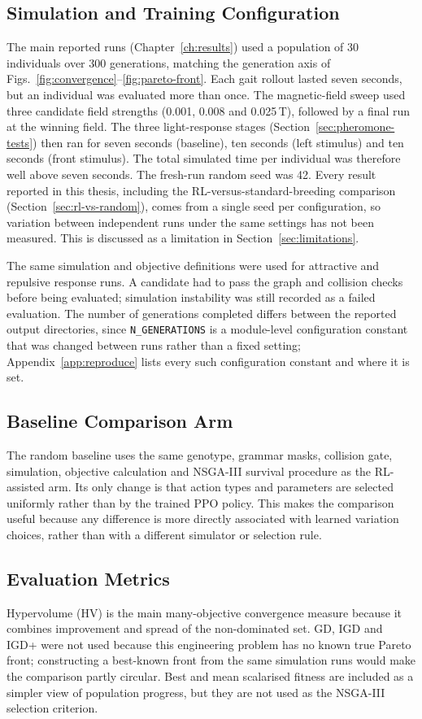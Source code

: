 \documentclass[12pt,a4paper]{report}
\begin{document}
\subsection{Simulation and Training Configuration}
The main reported runs (Chapter~\ref{ch:results}) used a population of 30 individuals over 300 generations, matching the generation axis of Figs.~\ref{fig:convergence}--\ref{fig:pareto-front}. Each gait rollout lasted seven seconds, but an individual was evaluated more than once. The magnetic-field sweep used three candidate field strengths (0.001, 0.008 and 0.025\,T), followed by a final run at the winning field. The three light-response stages (Section~\ref{sec:pheromone-tests}) then ran for seven seconds (baseline), ten seconds (left stimulus) and ten seconds (front stimulus). The total simulated time per individual was therefore well above seven seconds. The fresh-run random seed was 42. Every result reported in this thesis, including the RL-versus-standard-breeding comparison (Section~\ref{sec:rl-vs-random}), comes from a single seed per configuration, so variation between independent runs under the same settings has not been measured. This is discussed as a limitation in Section~\ref{sec:limitations}.

The same simulation and objective definitions were used for attractive and repulsive response runs. A candidate had to pass the graph and collision checks before being evaluated; simulation instability was still recorded as a failed evaluation. The number of generations completed differs between the reported output directories, since \texttt{N\_GENERATIONS} is a module-level configuration constant that was changed between runs rather than a fixed setting; Appendix~\ref{app:reproduce} lists every such configuration constant and where it is set.

\subsection{Baseline Comparison Arm}
The random baseline uses the same genotype, grammar masks, collision gate, simulation, objective calculation and NSGA-III survival procedure as the RL-assisted arm. Its only change is that action types and parameters are selected uniformly rather than by the trained PPO policy. This makes the comparison useful because any difference is more directly associated with learned variation choices, rather than with a different simulator or selection rule.

\subsection{Evaluation Metrics}
\label{sec:eval-metrics}
Hypervolume (HV) is the main many-objective convergence measure because it combines improvement and spread of the non-dominated set. GD, IGD and IGD+ were not used because this engineering problem has no known true Pareto front; constructing a best-known front from the same simulation runs would make the comparison partly circular. Best and mean scalarised fitness are included as a simpler view of population progress, but they are not used as the NSGA-III selection criterion.
\end{document}
